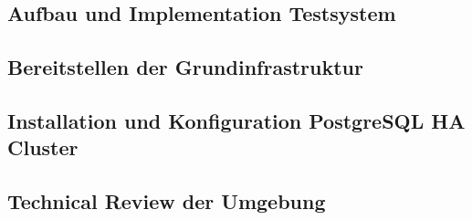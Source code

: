 
\begin{flushleft}
    \section{Aufbau und Implementation Testsystem}
    
    \subsection{Bereitstellen der Grundinfrastruktur}
    \subsection{Installation und Konfiguration PostgreSQL HA Cluster}
    \subsection{Technical Review der Umgebung}
\end{flushleft}
